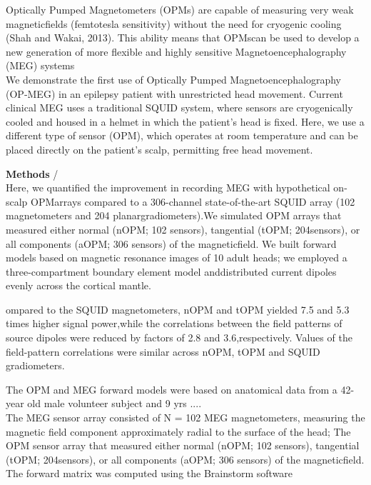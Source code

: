 \documentclass[a4paper]{article}
\begin{document}
Optically Pumped Magnetometers (OPMs) are capable of measuring very weak magneticfields (femtotesla sensitivity) without the need for cryogenic cooling (Shah and Wakai, 2013). This ability means that OPMscan be used to develop a new generation of more flexible and highly sensitive Magnetoencephalography (MEG) systems \\

We demonstrate the first use of Optically Pumped Magnetoencephalography (OP‐MEG) in an epilepsy patient with unrestricted head movement. Current clinical MEG uses a traditional SQUID system, where sensors are cryogenically cooled and housed in a helmet in which the patient’s head is fixed. Here, we use a different type of sensor (OPM), which operates at room temperature and can be placed directly on the patient’s scalp, permitting free head movement. 

\textbf{Methods} /  \\

 Here, we quantified the improvement in recording MEG with hypothetical on-scalp OPMarrays compared to a 306-channel state-of-the-art SQUID array (102 magnetometers and 204 planargradiometers).We simulated OPM arrays that measured either normal (nOPM; 102 sensors), tangential (tOPM; 204sensors), or all components (aOPM; 306 sensors) of the magneticfield. We built forward models based on magnetic resonance images of 10 adult heads; we employed a three-compartment boundary element model anddistributed current dipoles evenly across the cortical mantle.
 
 ompared to the SQUID magnetometers, nOPM and tOPM yielded 7.5 and 5.3 times higher signal power,while the correlations between the field patterns of source dipoles were reduced by factors of 2.8 and 3.6,respectively. Values of the field-pattern correlations were similar across nOPM, tOPM and SQUID gradiometers.

The OPM and MEG forward models were based on anatomical data from a 42-year old male volunteer subject and 9 yrs ....\\

The MEG sensor array consisted of N = 102 MEG magnetometers, measuring the magnetic field component approximately radial to the surface of the head; The OPM sensor array that measured either normal (nOPM; 102 sensors), tangential (tOPM; 204sensors), or all components (aOPM; 306 sensors) of the magneticfield.\\

The forward matrix was computed using the Brainstorm software
\end{document}
